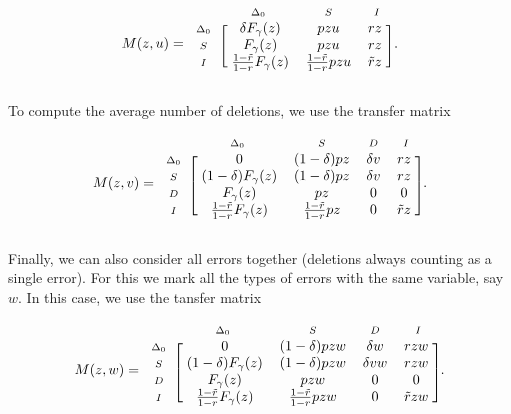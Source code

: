 \documentclass{article}
\newcommand{\smD}{\scriptstyle{D}}
\newcommand{\smI}{\scriptstyle{I}}
\newcommand{\smS}{\scriptstyle{S}}
\newcommand{\smDELz}{\scriptstyle{\Delta_0}}
\begin{document}
\begin{equation*}
M(z,u) = 
\begin{blockarray}{cccc}
       & \smDELz & \smS & \smI \\
\begin{block}{c[ccc]}
\smDELz & \; \delta F_\gamma(z) & pzu & rz \; \\
\smS    & \;        F_\gamma(z) & pzu & rz \; \\
\smI    & \; \frac{1-\tilde{r}}{1-r}F_\gamma(z)
           & \frac{1-\tilde{r}}{1-r}pzu & \tilde{r}z \; \\
\end{block}
\end{blockarray}.
\end{equation*}

To compute the average number of deletions, we use the transfer
matrix

\begin{equation*}
M(z,v) = 
\begin{blockarray}{ccccc}
       & \smDELz & \smS & \smD & \smI \\
\begin{block}{c[cccc]}
\smDELz & \; 0           & (1-\delta)pz & \delta v & rz \; \\
\smS    & \; (1-\delta)F_\gamma(z) & (1-\delta)pz & \delta v & rz \; \\
\smD    & \; F_\gamma(z) & pz & 0        & 0 \; \\
\smI    & \; \frac{1-\tilde{r}}{1-r}F_\gamma(z)
           & \frac{1-\tilde{r}}{1-r}pz & 0 & \tilde{r}z \; \\
\end{block}
\end{blockarray}.
\end{equation*}

Finally, we can also consider all errors together (deletions always
counting as a single error). For this we mark all the types of errors with
the same variable, say $w$. In this case, we use the tansfer matrix

\begin{equation*}
M(z,w) = 
\begin{blockarray}{ccccc}
       & \smDELz & \smS & \smD & \smI \\
\begin{block}{c[cccc]}
\smDELz & \; 0           & (1-\delta)pzw & \delta w & rzw \; \\
\smS    & \; (1-\delta)F_\gamma(z) & (1-\delta)pzw & \delta vw & rzw \; \\
\smD    & \; F_\gamma(z) & pzw & 0        & 0 \; \\
\smI    & \; \frac{1-\tilde{r}}{1-r}F_\gamma(z)
           & \frac{1-\tilde{r}}{1-r}pzw & 0 & \tilde{r}zw \; \\
\end{block}
\end{blockarray}.
\end{equation*}
\end{document}
